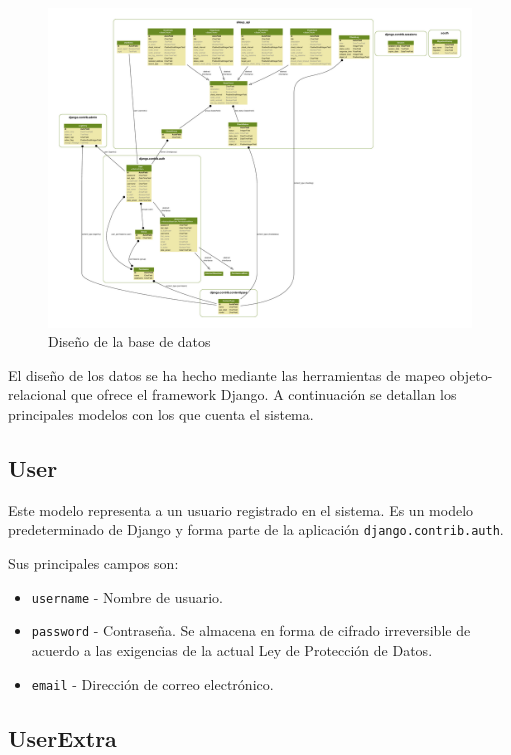\begin{figure}[htbp]
  \centering
  \includegraphics[angle=90, width=\textwidth]{5_diseno/diagrama-modelos}
  \caption{Diseño de la base de datos}
  \label{fig:diagrama-modelos}
\end{figure}

El diseño de los datos se ha hecho mediante las herramientas de mapeo
objeto-relacional que ofrece el framework Django. A continuación se detallan los
principales modelos con los que cuenta el sistema.

\subsection{User}

Este modelo representa a un usuario registrado en el sistema. Es un modelo
predeterminado de Django y forma parte de la aplicación \texttt{django.contrib.auth}.

Sus principales campos son:

\begin{itemize}
\item \texttt{username} - Nombre de usuario.
\item \texttt{password} - Contraseña. Se almacena en forma de cifrado
  irreversible de acuerdo a las exigencias de la actual Ley de Protección de Datos.
\item \texttt{email} - Dirección de correo electrónico.
\end{itemize}

\subsection{UserExtra}

